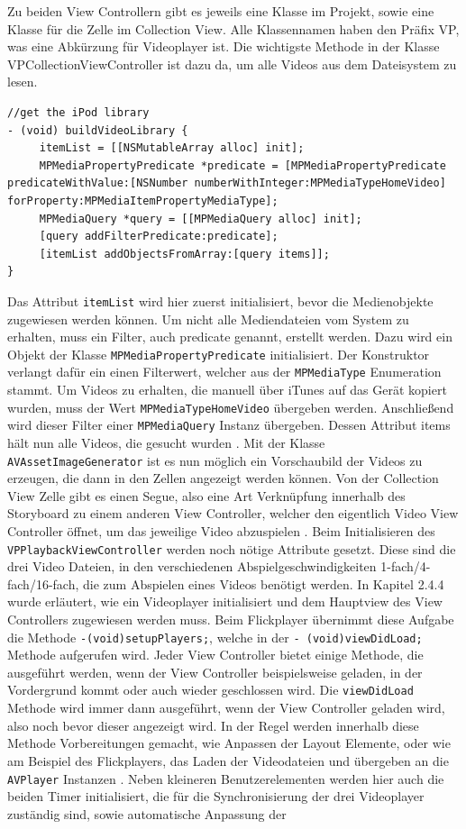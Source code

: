 \documentclass[11pt,a4paper]{report}
\begin{document}
Zu beiden View Controllern gibt es jeweils eine Klasse im Projekt, sowie eine Klasse für die Zelle im Collection View. Alle Klassennamen haben den Präfix VP, was eine Abkürzung für Videoplayer ist. Die wichtigste Methode in der Klasse VPCollectionViewController ist dazu da, um alle Videos aus dem Dateisystem zu lesen.
\begin{lstlisting}
//get the iPod library
- (void) buildVideoLibrary {
	 itemList = [[NSMutableArray alloc] init];
	 MPMediaPropertyPredicate *predicate = [MPMediaPropertyPredicate predicateWithValue:[NSNumber numberWithInteger:MPMediaTypeHomeVideo] forProperty:MPMediaItemPropertyMediaType];
	 MPMediaQuery *query = [[MPMediaQuery alloc] init];
	 [query addFilterPredicate:predicate];
	 [itemList addObjectsFromArray:[query items]];
}
\end{lstlisting}
Das Attribut \texttt{itemList} wird hier zuerst initialisiert, bevor die Medienobjekte zugewiesen werden können. Um nicht alle Mediendateien vom System zu erhalten, muss ein Filter, auch predicate genannt, erstellt werden. Dazu wird ein Objekt der Klasse \texttt{MPMediaPropertyPredicate} initialisiert. Der Konstruktor verlangt dafür ein einen Filterwert, welcher aus der \texttt{MPMediaType} Enumeration stammt. Um Videos zu erhalten, die manuell über iTunes auf das Gerät kopiert wurden, muss der Wert \texttt{MP\-Media\-Type\-Home\-Video} übergeben werden. Anschließend wird dieser Filter einer \texttt{MPMediaQuery} Instanz übergeben. Dessen Attribut items hält nun alle Videos, die gesucht wurden \cite{MPMediaQueryClassReference}. Mit der Klasse \texttt{AVAssetImageGenerator} ist es nun möglich ein Vorschaubild der Videos zu erzeugen, die dann in den Zellen angezeigt werden können. Von der Collection View Zelle gibt es einen Segue, also eine Art Verknüpfung innerhalb des Storyboard zu einem anderen View Controller, welcher den eigentlich Video View Controller öffnet, um das jeweilige Video abzuspielen \cite{StoryboardSegue}. Beim Initialisieren des \texttt{VP\-Playback\-View\-Controller} werden noch nötige Attribute gesetzt. Diese sind die drei Video Dateien, in den verschiedenen Abspielgeschwindigkeiten 1-fach/4-fach/16-fach, die zum Abspielen eines Videos benötigt werden. In Kapitel 2.4.4 wurde erläutert, wie ein Videoplayer initialisiert und dem Hauptview des View Controllers zugewiesen werden muss. Beim Flickplayer übernimmt diese Aufgabe die Methode \texttt{-(void)setupPlayers;}, welche in der \texttt{- (void)viewDidLoad;} Methode aufgerufen wird. Jeder View Controller bietet einige Methode, die ausgeführt werden, wenn der View Controller beispielsweise geladen, in der Vordergrund kommt oder auch wieder geschlossen wird. Die \texttt{viewDidLoad} Methode wird immer dann ausgeführt, wenn der View Controller geladen wird, also noch bevor dieser angezeigt wird. In der Regel werden innerhalb diese Methode Vorbereitungen gemacht, wie Anpassen der Layout Elemente, oder wie am Beispiel des Flickplayers, das Laden der Videodateien und übergeben an die \texttt{AVPlayer} Instanzen \cite{UIViewControllerClass}. Neben kleineren Benutzerelementen werden hier auch die beiden Timer initialisiert, die für die Synchronisierung der drei Videoplayer zuständig sind, sowie automatische Anpassung der 
\end{document}
